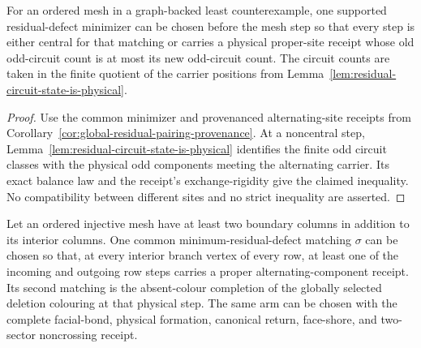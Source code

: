 \begin{corollary}
\label{cor:global-residual-circuit-monotonicity}
For an ordered mesh in a graph-backed least counterexample, one supported
residual-defect minimizer can be chosen before the mesh step so that every
step is either central for that matching or carries a physical proper-site
receipt whose old odd-circuit count is at most its new odd-circuit count.
The circuit counts are taken in the finite quotient of the carrier positions
from Lemma~\ref{lem:residual-circuit-state-is-physical}.
\end{corollary}

\begin{proof}
Use the common minimizer and provenanced alternating-site receipts from
Corollary~\ref{cor:global-residual-pairing-provenance}.  At a noncentral step,
Lemma~\ref{lem:residual-circuit-state-is-physical} identifies the finite odd
circuit classes with the physical odd components meeting the alternating
carrier.  Its exact balance law and the receipt's exchange-rigidity give the
claimed inequality.  No compatibility between different sites and no strict
inequality are asserted.
\end{proof}

\begin{corollary}
\label{cor:internal-mesh-junction-proper-residual-site}
Let an ordered injective mesh have at least two boundary columns in addition
to its interior columns.  One common minimum-residual-defect matching
\(\sigma\) can be chosen so that, at every interior branch vertex of every
row, at least one of the incoming and outgoing row steps carries a proper
alternating-component receipt.  Its second matching is the absent-colour
completion of the globally selected deletion colouring at that physical
step.  The same arm can be chosen with the complete facial-bond, physical
formation, canonical return, face-shore, and two-sector noncrossing receipt.
\end{corollary}

